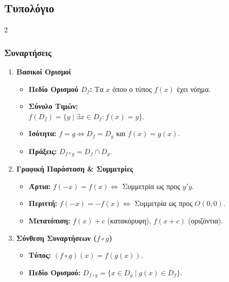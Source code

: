 \documentclass[a4paper,11pt,twoside]{article}
\newcommand{\myleftmark}{\leftmark}
\renewcommand{\myleftmark}{{\large Τυπολόγιο}}
\begin{document}
\newpage
\renewcommand{\myleftmark}{{\large Τυπολόγιο}}
\begin{center}
\part{Τυπολόγιο}
\end{center}

\begin{multicols}{2}

\section{Συναρτήσεις}
\begin{enumerate}
    \item \textbf{Βασικοί Ορισμοί}
    \begin{itemize}[leftmargin=0mm]
        \item \textbf{Πεδίο Ορισμού $D_f$:} Τα $x$ όπου ο τύπος $f(x)$ έχει νόημα.
        \item \textbf{Σύνολο Τιμών:}\\$f(D_f) = \{y \mid \exists x \in D_f : f(x)=y\}$.
        \item \textbf{Ισότητα:} $f=g \Leftrightarrow D_f=D_g$ και $f(x)=g(x)$.
        \item \textbf{Πράξεις:} $D_{f*g} = D_f \cap D_g$.
    \end{itemize}

    \item \textbf{Γραφική Παράσταση \& Συμμετρίες}
    \begin{itemize}[leftmargin=0mm]
        \item \textbf{Άρτια:} $f(-x)=f(x) \Leftrightarrow$ Συμμετρία ως προς $y'y$.
        \item \textbf{Περιττή:} $f(-x)=-f(x) \Leftrightarrow$ Συμμετρία ως προς $O(0,0)$.
        \item \textbf{Μετατόπιση:} $f(x)+c$ (κατακόρυφη), $f(x+c)$ (οριζόντια).
    \end{itemize}

    \item \textbf{Σύνθεση Συναρτήσεων ($f \circ g$)}
    \begin{itemize}[leftmargin=0mm]
        \item \textbf{Τύπος:} $(f \circ g)(x) = f(g(x))$.
        \item \textbf{Πεδίο Ορισμού:} $D_{f \circ g} = \{ x \in D_g \mid g(x) \in D_f \}$.
    \end{itemize}


\end{enumerate}
\end{multicols}
\end{document}

